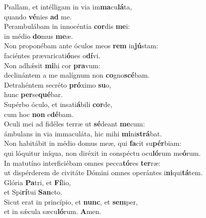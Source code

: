 \evenverse Psallam, et intélligam in via im\textbf{ma}cu\textbf{lá}ta,~\*\\
\evenverse quando \textbf{vé}nies \textbf{ad} me.\\
\oddverse Perambulábam in innocéntia \textbf{cor}dis \textbf{me}i:~\*\\
\oddverse in médio \textbf{do}mus \textbf{me}æ.\\
\evenverse Non proponébam ante óculos meos \textbf{rem} in\textbf{jú}stam:~\*\\
\evenverse faciéntes prævaricati\textbf{ó}nes o\textbf{dí}vi.\\
\oddverse Non adhǽsit \textbf{mi}hi cor \textbf{pra}vum:~\*\\
\oddverse declinántem a me malígnum non \textbf{co}gno\textbf{scé}bam.\\
\evenverse Detrahéntem secréto \textbf{pró}ximo \textbf{su}o,~\*\\
\evenverse hunc \textbf{per}se\textbf{qué}bar.\\
\oddverse Supérbo óculo, et insati\textbf{á}bili \textbf{cor}de,~\*\\
\oddverse cum hoc \textbf{non} e\textbf{dé}bam.\\
\evenverse Oculi mei ad fidéles terræ ut \textbf{sé}deant \textbf{me}cum:~\*\\
\evenverse ámbulans in via immaculáta, hic mihi \textbf{mi}ni\textbf{strá}bat.\\
\oddverse Non habitábit in médio domus meæ, qui \textbf{fa}cit su\textbf{pér}biam:~\*\\
\oddverse qui lóquitur iníqua, non diréxit in conspéctu ocu\textbf{ló}rum me\textbf{ó}rum.\\
\evenverse In matutíno interficiébam omnes pecca\textbf{tó}res \textbf{ter}ræ:~\*\\
\evenverse ut dispérderem de civitáte Dómini omnes operántes i\textbf{ni}qui\textbf{tá}tem.\\
\oddverse Glória \textbf{Pa}tri, et \textbf{Fí}lio,~\*\\
\oddverse et Spi\textbf{rí}tui \textbf{San}cto.\\
\evenverse Sicut erat in princípio, et \textbf{nunc}, et \textbf{sem}per,~\*\\
\evenverse et in sǽcula sæcu\textbf{ló}rum. \textbf{A}men.\\
